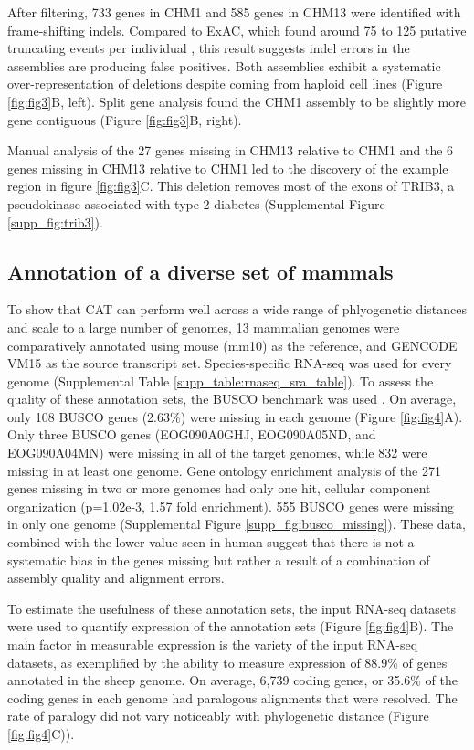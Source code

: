 \documentclass[fleqn,10pt]{wlscirep}
\begin{document}
	After filtering, 733 genes in CHM1 and 585 genes in CHM13 were identified with frame-shifting indels. Compared to ExAC, which found around 75 to 125 putative truncating events per individual \cite{karczewski2016exac}, this result suggests indel errors in the assemblies are producing false positives. Both assemblies exhibit a systematic over-representation of deletions despite coming from haploid cell lines (Figure \ref{fig:fig3}B, left). Split gene analysis found the CHM1 assembly to be slightly more gene contiguous (Figure \ref{fig:fig3}B, right).

Manual analysis of the 27 genes missing in CHM13 relative to CHM1 and the 6 genes missing in CHM13 relative to CHM1 led to the discovery of the example region in figure \ref{fig:fig3}C. This deletion removes most of the exons of TRIB3, a pseudokinase associated with type 2 diabetes \cite{shi2009association} (Supplemental Figure \ref{supp_fig:trib3}).


\subsection*{Annotation of a diverse set of mammals}
	To show that CAT can perform well across a wide range of phlyogenetic distances and scale to a large number of genomes, 13 mammalian genomes were comparatively annotated using mouse (mm10) as the reference, and GENCODE VM15 as the source transcript set. Species-specific RNA-seq was used for every genome (Supplemental Table \ref{supp_table:rnaseq_sra_table}). To assess the quality of these annotation sets, the BUSCO benchmark was used \cite{simao2015busco}. On average, only 108 BUSCO genes (2.63\%) were missing in each genome  (Figure \ref{fig:fig4}A). Only three BUSCO genes (EOG090A0GHJ, EOG090A05ND, and EOG090A04MN) were missing in all of the target genomes, while 832 were missing in at least one genome. Gene ontology enrichment analysis of the 271 genes missing in two or more genomes had only one hit, cellular component organization (p=1.02e-3, 1.57 fold enrichment). 555 BUSCO genes were missing in only one genome (Supplemental Figure \ref{supp_fig:busco_missing}). These data, combined with the lower value seen in human suggest that there is not a systematic bias in the genes missing but rather a result of a combination of assembly quality and alignment errors.

To estimate the usefulness of these annotation sets, the input RNA-seq datasets were used to quantify expression of the annotation sets (Figure \ref{fig:fig4}B). The main factor in measurable expression is the variety of the input RNA-seq datasets, as exemplified by the ability to measure expression of 88.9\% of genes annotated in the sheep genome. On average, 6,739 coding genes, or 35.6\% of the coding genes in each genome had paralogous alignments that were resolved. The rate of paralogy did not vary noticeably with phylogenetic distance (Figure \ref{fig:fig4}C)).
\end{document}
